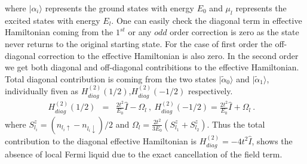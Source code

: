 \documentclass[reprint,prb,superscriptaddress]{revtex4-2}
\begin{document}
where $|\alpha_i\rangle$ represents the ground states with energy $E_0$ and $\mu_l$ represents the excited states with energy $E_l$. One can easily check the diagonal term in effective Hamiltonian coming from the $1^{st}$ or any $odd$ order correction is zero as the state never returns to the original starting state. For the case of first order the off-diagonal correction to the effective Hamiltonian is also zero. In the second order we get both diagonal and off-diagonal contribitions to the effective Hamiltonian. 
Total diagonal contribution is coming from the two states $|\tilde{\alpha}_0\rangle$ and $|\tilde{\alpha}_1\rangle$, individually fiven as $H^{(2)}_{diag} (1/2)$,$H^{(2)}_{diag} (-1/2)$ respectively.
\begin{eqnarray}
H^{(2)}_{diag} (1/2) &=& \frac{2t^2}{E_0} \hat{I} - \Omega_l~,~ H^{(2)}_{diag} (-1/2) = \frac{2t^2}{E_0} \hat{I} + \Omega_l ~.~~~~
\end{eqnarray}
where $S_{l_i}^z=(n_{l_i\uparrow}-n_{l_i\downarrow})/2$ and $\Omega_l=\frac{2t^2}{3E_0} ( S_{l_1}^z + S_{l_2}^z)$.  Thus the total contribution to the diagonal effective Hamiltonian is $H^{(2)}_{diag} = -4t^2 \hat{I}$, shows the absence of local Fermi liquid due to the exact cancellation of the field term.
\end{document}
